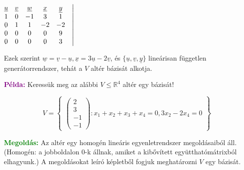 \documentclass[../szamtud.tex]{subfiles}
\begin{document}
            \begin{minipage}{.25\linewidth}
                $
                    \begin{matrix}
                        \underline{u} & \underline{v} & \underline{w} & \underline{x} & \underline{y} & \bigm| \\
                        1 & 0 & -1 & 3 & 1 & \bigm| \\
                        0 & 1 & 1 & -2 & -2 & \bigm| \\
                        0 & 0 & 0 & 0 & 9 & \bigm| \\
                        0 & 0 & 0 & 0 & 3 & \bigm| 
                    \end{matrix} 
                $
            \end{minipage}
            \begin{minipage}{.5\linewidth}
                Ezek szerint $\underline{w} = \underline{v} - \underline{u}, \underline{x} = 3\underline{u} - 2\underline{v}$, és $\{\underline{u}, \underline{v}, \underline{y}\}$ lineárisan független generátorrendszer, tehát a $V$ altér bázisát alkotja.
            \end{minipage}
        
        \textcolor{purple}{\textbf{Példa:}} Keressük meg az alábbi $V \leq \mathbb{R}^4$ altér egy bázisát!

            \[
                V = \begin{Bmatrix}
                    \begin{pmatrix}
                        2 \\
                        3 \\
                        -1 \\
                        -1 
                    \end{pmatrix} : x_1 + x_2 + x_3 + x_4 = 0, 3x_2 - 2x_4 = 0
                \end{Bmatrix}
            \]

        \textcolor{green}{\textbf{Megoldás:}} Az altér egy homogén lineáris egyenletrendszer megoldásaiból áll. (Homogén: a jobboldalon 0-k állnak, amiket a kibővített együtthatómátrixból elhagyunk.) A megoldásokat leíró képletből fogjuk meghatározni $V$ egy bázisát.
\end{document}
